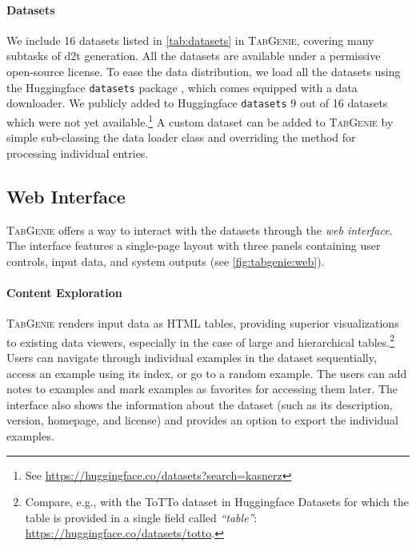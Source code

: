

\paragraph{Datasets}
We include 16 datasets listed in \autoref{tab:datasets} in \textsc{TabGenie}, covering many subtasks of \ac{d2t} generation. All the datasets are available under a permissive open-source license. To ease the data distribution, we load all the datasets using the Huggingface \texttt{datasets} package \cite{lhoest2021datasets}, which comes equipped with a data downloader. We publicly added to Huggingface \texttt{datasets} 9 out of 16 datasets which were not yet available.\footnote{See \url{https://huggingface.co/datasets?search=kasnerz}} A custom dataset can be added to \textsc{TabGenie} by simple sub-classing the data loader class and overriding the method for processing individual entries.

\subsection{Web Interface}
\label{sec:tabgenie:web}

\textsc{TabGenie} offers a way to interact with the datasets through the \textit{web interface}. The interface features a single-page layout with three panels containing user controls, input data, and system outputs (see \autoref{fig:tabgenie:web}).

\paragraph{Content Exploration} \textsc{TabGenie} renders input data as HTML tables, providing superior visualizations to existing data viewers, especially in the case of large and hierarchical tables.\footnote{Compare, e.g., with the ToTTo dataset in Huggingface Datasets for which the table is provided in a single field called \textit{``table''}: \url{https://huggingface.co/datasets/totto}.} Users can navigate through individual examples in the dataset sequentially, access an example using its index, or go to a random example. The users can add notes to examples and mark examples as favorites for accessing them later. The interface also shows the information about the dataset (such as its description, version, homepage, and license) and provides an option to export the individual examples.

